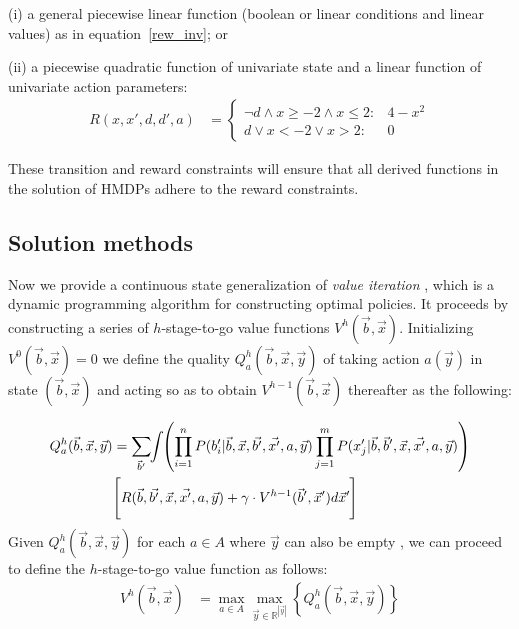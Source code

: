\documentclass[twoside,11pt]{article}
\begin{document}
(i) a general piecewise linear function (boolean or linear conditions and linear values) as in equation~\eqref{rew_inv}; or

(ii) a piecewise quadratic function of univariate state and a linear function of univariate action parameters:
\begin{align}
R(x,x',d,d', a) & = \begin{cases}
\neg d \land x \geq -2 \land x \leq 2 : & 4 - x^2 \\
d \lor x < -2 \lor x > 2 : & 0
\end{cases} \nonumber 
\end{align}

These transition and reward constraints will ensure that all derived functions in the solution of HMDPs adhere to the reward 
constraints.

\subsection{Solution methods}
\label{sec:soln}
Now we provide a continuous state generalization of {\it value
iteration} \cite{bellman}, which is a dynamic programming algorithm
for constructing optimal policies.  It proceeds by constructing a
series of $h$-stage-to-go value functions $V^h(\vec{b},\vec{x})$.
Initializing $V^0(\vec{b},\vec{x}) = 0$ we define the quality
$Q_a^{h}(\vec{b},\vec{x},\vec{y})$ of taking action $a(\vec{y})$ in state
$(\vec{b},\vec{x})$ and acting so as to obtain
$V^{h-1}(\vec{b},\vec{x})$ thereafter as the following:

\vspace{-4mm}
{%
\begin{align}
Q_a^{h}(\vec{b},\vec{x},\vec{y}) & = 
 \sum_{\vec{b}'} \hspace{-1.0mm} \int \hspace{-1.0mm} \left( \prod_{i=1}^n P(b_i'|\vec{b},\vec{x},\vec{b'},\vec{x'},a,\vec{y}) \prod_{j=1}^m P(x_j'|\vec{b},\vec{b}',\vec{x},\vec{x'},a,\vec{y}) \right) \label{eq:qfun} \\ 
& \Bigg[ R(\vec{b},\vec{b'},\vec{x},\vec{x'}, a,\vec{y}) + \gamma \cdot V^{h-1}(\vec{b}',\vec{x}') d\vec{x}'  \hspace{-0.2mm} \Bigg] \nonumber
\end{align}}
Given $Q_a^h(\vec{b},\vec{x},\vec{y})$ for each $a \in A$ where $\vec{y}$ can also be empty , we can proceed
to define the $h$-stage-to-go value function as follows:
\begin{align}
V^{h}(\vec{b},\vec{x}) & = \max_{a \in A} \max_{\vec{y} \in \mathbb{R}^{|\vec{y}|}} \left\{ Q^{h}_a(\vec{b},\vec{x},\vec{y}) \right\} \label{eq:vfun}
\end{align}
\end{document}
